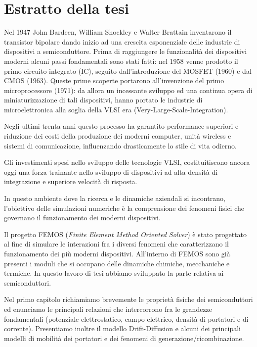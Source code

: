 \chapter{Estratto della tesi}

Nel 1947 John Bardeen, William Shockley e Walter Brattain inventarono il transistor bipolare dando inizio ad una crescita esponenziale delle industrie di dispositivi a semiconduttore. Prima di raggiungere le funzionalit\`a dei dispositivi moderni alcuni passi fondamentali sono stati fatti: nel 1958 venne prodotto il primo circuito integrato (IC), seguito dall'introduzione del MOSFET (1960) e dal CMOS (1963). Queste prime scoperte portarono all'invenzione del primo microprocessore (1971): da allora un incessante sviluppo ed una continua opera di miniaturizzazione di tali dispositivi, hanno portato le industrie di microelettronica alla soglia della VLSI era (Very-Large-Scale-Integration). 

Negli ultimi trenta anni questo processo ha garantito performance superiori e riduzione dei costi della produzione dei moderni computer, unit\`a wireless e sistemi di comunicazione, influenzando drasticamente lo stile di vita odierno.

Gli investimenti spesi nello sviluppo delle tecnologie VLSI, costituitiscono ancora oggi una forza trainante nello sviluppo di dispositivi ad alta densit\`a di integrazione e superiore velocit\`a di risposta.

In questo ambiente dove la ricerca e le dinamiche aziendali si incontrano, l'obiettivo delle simulazioni numeriche \`e la comprensione dei fenomeni fisici che governano il funzionamento dei moderni dispositivi.

Il progetto FEMOS (\textit{Finite Element Method Oriented Solver}) \`e stato progettato al fine di simulare le interazioni fra i diversi fenomeni che caratterizzano il funzionamento dei pi\`u moderni dispositivi. All'interno di FEMOS sono gi\`a presenti i moduli che si occupano delle dinamiche chimiche, mecchaniche e termiche. In questo lavoro di tesi abbiamo sviluppato la parte relativa ai semiconduttori. 

Nel primo capitolo richiamiamo brevemente le propriet\`a fisiche dei semiconduttori ed enunciamo le principali relazioni che intercorrono fra le grandezze fondamentali (potenziale elettrostatico, campo elettrico, densit\`a di portatori e di corrente). Presentiamo inoltre il modello Drift-Diffusion e alcuni dei principali modelli di mobilit\`a dei portatori e dei fenomeni di generazione/ricombinazione.

